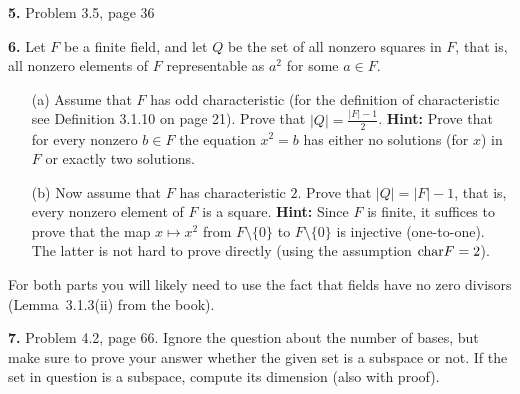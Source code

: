 \documentclass[12pt]{amsart}
\begin{document}
{\bf 5.} Problem 3.5, page 36

{\bf 6.} Let $F$ be a finite field, and let $Q$ be the set of all nonzero squares in $F$, that is, all nonzero elements of $F$ representable as $a^2$ for some $a\in F$.
\begin{itemize}
\item[(a)] Assume that $F$ has odd characteristic (for the definition of characteristic see Definition 3.1.10 on page 21). Prove that $|Q|=\frac{|F|-1}{2}$.
{\bf Hint:} Prove that for every nonzero $b\in F$ the equation $x^2=b$ has either no solutions (for $x$) in $F$ or exactly two solutions. 
\item[(b)] Now assume that $F$ has characteristic $2$. Prove that $|Q|=|F|-1$, that is, every nonzero element of $F$ is a square. {\bf Hint:}
Since $F$ is finite, it suffices to prove that the map $x\mapsto x^2$ from $F\setminus\{0\}$ to $F\setminus\{0\}$ is injective (one-to-one). The latter is not hard to prove directly (using the assumption ${\rm char} F=2$). 
\end{itemize}
For both parts you will likely need to use the fact that fields have no zero divisors (Lemma~3.1.3(ii) from the book).


{\bf 7.} Problem 4.2, page 66. Ignore the question about the number of bases, but make sure to prove your answer whether the given set is a subspace or not. If the set in question is a subspace, compute its dimension (also with proof).
\end{document}
